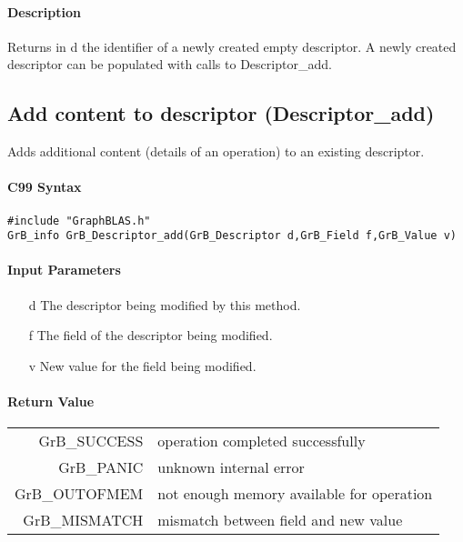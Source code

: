 \documentclass[11pt]{extarticle}
\begin{document}
\paragraph{Description}

Returns in {\sf d} the identifier of a newly created empty descriptor.
A newly created descriptor can be populated with calls to
{\sf Descriptor\_add}.

\subsection{Add content to descriptor ({\sf Descriptor\_add})}


Adds additional content (details of an operation) to an existing descriptor.

\paragraph{C99 Syntax}

\begin{verbatim}
#include "GraphBLAS.h"
GrB_info GrB_Descriptor_add(GrB_Descriptor d,GrB_Field f,GrB_Value v)
\end{verbatim}

\paragraph{Input Parameters}

\begin{itemize}
	\item[{\sf d}] The descriptor being modified by this method.
	\item[{\sf f}] The field of the descriptor being modified.
	\item[{\sf v}] New value for the field being modified.
\end{itemize}

\paragraph{Return Value}

\begin{tabular}{rl} 
{\sf GrB\_SUCCESS} 	& operation completed successfully \\
{\sf GrB\_PANIC}	& unknown internal error \\
{\sf GrB\_OUTOFMEM}	& not enough memory available for operation \\
{\sf GrB\_MISMATCH}	& mismatch between field and new value
\end{tabular}
\end{document}
